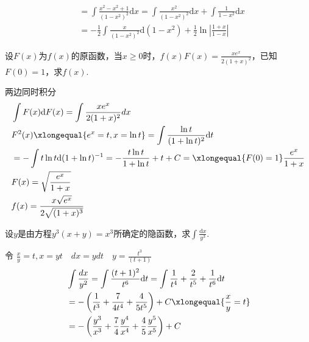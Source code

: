 \begin{xiti}
\begin{solution}
\begin{align*}
		&=\int \frac{x^{2}-x^{2}+1}{\left(1-x^{2}\right)^{2}} \mathrm{d} x=\int \frac{x^{2}}{\left(1-x^{2}\right)^{2}} \mathrm{d} x+\int \frac{1}{1-x^{2}} \mathrm{d} x \\ &{}=-\frac{1}{2} \int \frac{x}{\left(1-x^{2}\right)^{2}} \mathrm{d}\left(1-x^{2}\right)+\frac{1}{2} \ln \left|\frac{1+x}{1-x}\right| 
	\end{align*}	
\end{solution}
\item 设$F(x)$为$f(x)$的原函数，当$x\geq 0$时，$f ( x ) F ( x ) = \frac { x e ^ { x } } { 2 ( 1 + x ) ^ { 2 } }$，已知$F(0)=1$，求$f(x)$.
\begin{solution}
	两边同时积分
	\begin{align*}
		&\int F(x)  \mathrm{d}F(x) =\int \frac{x e^{x}}{2(1+x)^{2}} dx \\
		& F^2(x)\xlongequal{e^x=t,x=\ln t}=  \int \frac{\ln t}{(1+\ln t)^2} \mathrm{d}t\\
		&= - \int t \ln t \mathrm{d} (1+\ln t)^{-1} = -\frac{t \ln t}{1+ \ln t} +t +C = \xlongequal{F(0)=1}\frac{e^x }{1+ x} \\
		&F(x)=\sqrt{\frac{e^x}{1+x}} \\
		&f(x)= \frac{x\sqrt{e^x}}{2\sqrt{(1+x)^3}}
	\end{align*}
\end{solution}	
\item 设$y$是由方程$y ^ { 3 } ( x + y ) = x ^ { 3 }$所确定的隐函数，求$\int \frac {\mathrm{d}x } { y ^ { 3 } }$.
\begin{solution}
	令 $\frac{x}{y}=t,x=yt \quad dx=ydt \quad y= \frac{t^3}{(t+1)} $ 
	\begin{align*}
		&\int \frac{dx}{y^2} = \int \frac{(t+1)^2}{t^6} \mathrm{d}t = \int \frac{1}{t^4} + \frac{2}{t^5} +\frac{1}{t^6} \mathrm{d} t\\
		&=  -\left( \frac{1}{t^3} +\frac{7}{4t^4} +\frac{4}{5t^5}\right) +C  \xlongequal{\frac{x}{y}=t}\\
		&=-\left(\frac{y^{3}}{x^{3}}+\frac{7}{4} \frac{y^{4}}{x^{4}}+\frac{4}{5} \frac{y^{5}}{x^{5}}\right)+C 
	\end{align*}
\end{solution}	
\end{xiti}



